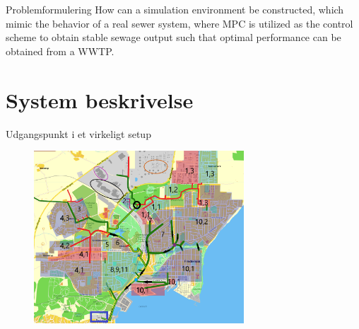 \begin{frame}{Problemformulering}{}
\vfill\vfill\centering
How can a simulation environment be constructed, which mimic the behavior of a real
sewer system, where MPC is utilized as the control scheme to obtain stable sewage output
such that optimal performance can be obtained from a WWTP.
\vfill\vfill
\end{frame}

\section{System beskrivelse} %


\begin{frame}{Udgangspunkt i et virkeligt setup}{}
\begin{figure}[H]
\centering
\includegraphics[width=0.7\textwidth]{Sections/pictures/kloakgrid_simplified10.png}
\end{figure}
\end{frame}

